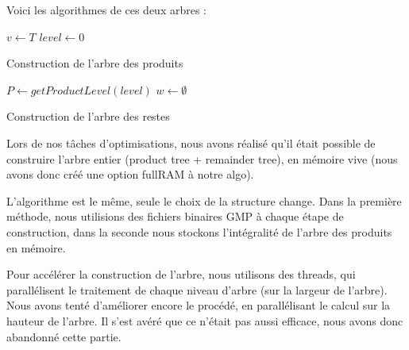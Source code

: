 \documentclass[a4paper,11pt,french]{article}
\begin{document}
Voici les algorithmes de ces deux arbres :

\begin{algorithm}[H]
\label{alg:productTree}
 $v \leftarrow T$\;
 $level \leftarrow 0$\;
 \caption{Construction de l'arbre des produits}
 
\end{algorithm}
\vspace{1cm}
\begin{algorithm}[H]
 \label{alg:remainderTree}
 $P \leftarrow getProductLevel(level)$\;
 $w \leftarrow \emptyset$\;
 \caption{Construction de l'arbre des restes}
\end{algorithm}


Lors de nos tâches d'optimisations, nous avons réalisé qu'il était possible de construire l'arbre entier (product tree + remainder tree), en mémoire vive (nous avons donc créé une option fullRAM à notre algo).

L'algorithme est le même, seule le choix de la structure change.
Dans la première méthode, nous utilisions des fichiers binaires GMP à chaque étape de construction, dans la  seconde nous stockons l'intégralité de l'arbre des produits en mémoire.

Pour accélérer la construction de l'arbre, nous utilisons des threads, qui parallélisent le traitement de chaque niveau d'arbre (sur la largeur de l'arbre).
Nous avons tenté d'améliorer encore le procédé, en parallélisant le calcul sur la hauteur de l'arbre. Il s'est avéré que ce n'était pas aussi efficace, nous avons donc abandonné cette partie.
\end{document}
